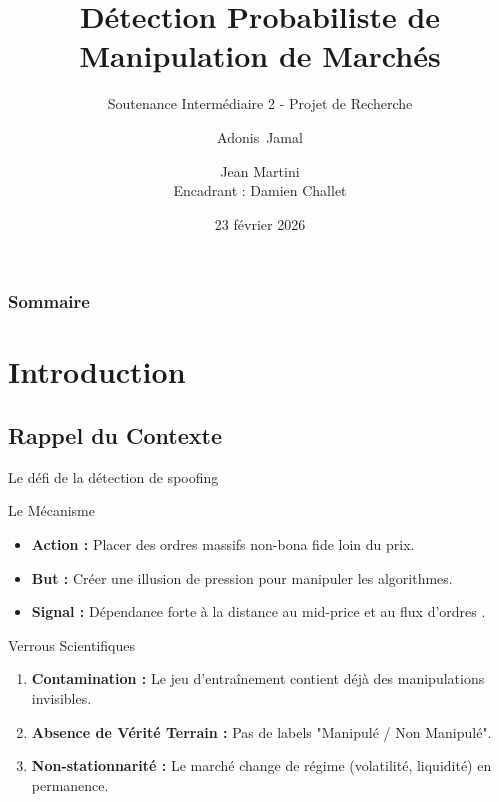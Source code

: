 \documentclass{beamer}
\title[Détection de Manipulation]{Détection Probabiliste de Manipulation de Marchés}
\subtitle{Soutenance Intermédiaire 2 - Projet de Recherche}
\author[Jamal, Martini]{Adonis~Jamal \and Jean Martini\\Encadrant : Damien Challet}
\institute[CentraleSupélec]{CentraleSupélec -- Laboratoire MICS}
\date[23 février 2026]{23 février 2026}
\begin{document}
\frame{\titlepage}

\begin{frame}
    \frametitle{Sommaire}
    \tableofcontents
\end{frame}

\section{Introduction}
\subsection{Rappel du Contexte}
\begin{frame}{Le défi de la détection de spoofing}
    \begin{block}{Le Mécanisme}
        \begin{itemize}
            \item \textbf{Action :} Placer des ordres massifs non-bona fide loin du prix.
            \item \textbf{But :} Créer une illusion de pression pour manipuler les algorithmes.
            \item \textbf{Signal :} Dépendance forte à la distance au mid-price et au flux d'ordres \cite{tao_2020}.
        \end{itemize}
    \end{block}
    \begin{alertblock}{Verrous Scientifiques}
        \begin{enumerate}
            \item \textbf{Contamination :} Le jeu d'entraînement contient déjà des manipulations invisibles.
            \item \textbf{Absence de Vérité Terrain :} Pas de labels "Manipulé / Non Manipulé".
            \item \textbf{Non-stationnarité :} Le marché change de régime (volatilité, liquidité) en permanence.
        \end{enumerate}
    \end{alertblock}
\end{frame}
\end{document}
